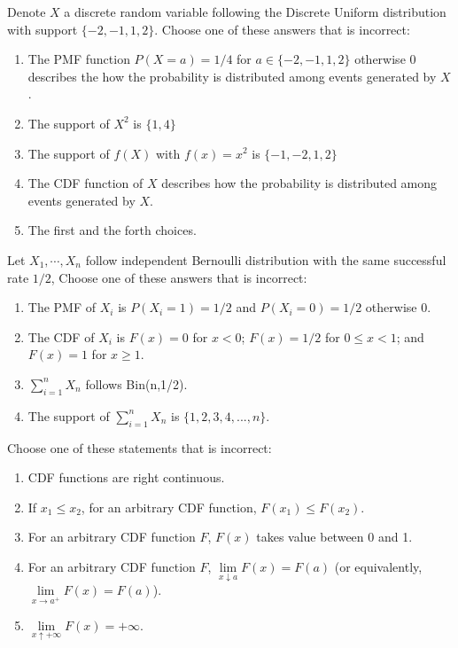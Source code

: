 \documentclass[poll_tutorial_format]{subfiles}
\begin{document}
 		
		
		\begin{exercise}
			Denote $X$ a discrete random variable following the Discrete Uniform distribution with support $\{-2,-1,1,2\}$.
			Choose one of these answers that is incorrect: %
				\begin{enumerate}
						\item The PMF function $P(X=a)=1/4$ for $a\in \{-2,-1,1,2\}$ otherwise 0 describes the how the probability is distributed among events generated by $X$. 
						\item The support of $X^2$ is $\{1,4\}$
						\item The support of $f(X)$ with $f(x)=x^2$ is $\{-1,-2,1,2\}$  
						\item The CDF function of $X$ describes how the probability is distributed among events generated by $X$.  
						\item The first and the forth choices.
					\end{enumerate}
			\end{exercise}
	
	
	\begin{exercise}
		Let $X_1,\cdots , X_n$ follow independent Bernoulli distribution with the same successful rate $1/2$, 
		Choose one of these answers that is incorrect: %
		\begin{enumerate}
			\item The PMF of $X_i$ is $P(X_i=1)=1/2$ and $P(X_i=0)=1/2$ otherwise 0.
			\item The CDF of $X_i$ is $F(x)=0$ for $x<0$; $F(x)=1/2$ for $0\leq x <1$; and $F(x)=1$ for $x\geq 1$.  
			\item $\sum_{i=1}^n X_n$ follows  Bin(n,1/2).
			\item The support of $\sum_{i=1}^n X_n$ is $\{1,2,3,4,...,n\}$.
		\end{enumerate}
	\end{exercise}
	
	
	
	\begin{exercise}
		Choose one of these statements that is incorrect: %
		\begin{enumerate}
			\item CDF functions are right continuous.
			\item If $x_1\leq x_2$, for an arbitrary CDF function, $F(x_1)\leq F(x_2)$.
			\item For an arbitrary CDF function $F$, $F(x)$ takes value between 0 and 1.
			\item For an arbitrary CDF function $F$, $\lim\limits_{x\downarrow a}F(x)=F(a)$ (or equivalently,  $\lim\limits_{x\rightarrow a^+}F(x)=F(a)$).
			\item $\lim\limits_{x\uparrow +\infty} F(x)=+\infty$. 
		\end{enumerate}
	\end{exercise}
	
\end{document}
